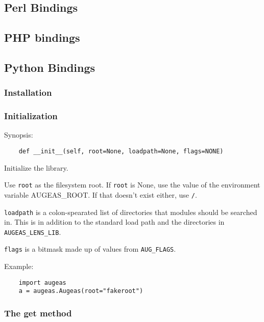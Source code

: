 \subsection{Perl Bindings}


\subsection{PHP bindings}


\subsection{Python Bindings}


\subsubsection{Installation}

\subsubsection{Initialization}

Synopsis:

\begin{verbatim}
    def __init__(self, root=None, loadpath=None, flags=NONE)
\end{verbatim}

Initialize the library.

Use \verb!root! as the filesystem root. If \verb!root! is None, use the value of the environment variable AUGEAS\_ROOT. If that doesn't exist either, use \nolinkurl{/}.

\verb!loadpath! is a colon-spearated list of directories that modules should be searched in. This is in addition to the standard load path and the directories in \verb!AUGEAS_LENS_LIB!.

\verb!flags! is a bitmask made up of values from \verb!AUG_FLAGS!.

Example:

\begin{verbatim}
    import augeas
    a = augeas.Augeas(root="fakeroot")
\end{verbatim}

\subsubsection{The get method}

